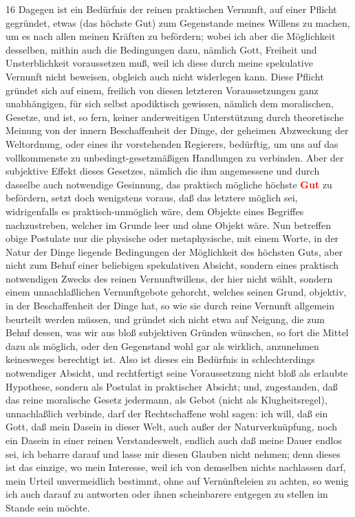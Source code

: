 \documentclass[a4paper,12pt,twoside]{book}
\newcommand{\match}[1]{\textcolor{red}{\textbf{#1}}}
\begin{document}
	
	16
	Dagegen ist ein Bedürfnis der reinen praktischen Vernunft, auf einer Pflicht gegründet, etwas (das höchste Gut) zum Gegenstande meines Willens zu machen, um es nach allen meinen Kräften zu befördern; wobei ich aber die Möglichkeit desselben, mithin auch die Bedingungen dazu, nämlich Gott, Freiheit und Unsterblichkeit voraussetzen muß, weil  ich diese durch meine spekulative Vernunft nicht beweisen, obgleich auch nicht widerlegen kann. Diese Pflicht gründet sich auf einem, freilich von diesen letzteren Voraussetzungen ganz unabhängigen, für sich selbst apodiktisch gewissen, nämlich dem moralischen, Gesetze, und ist, so fern, keiner anderweitigen Unterstützung durch theoretische Meinung von der innern Beschaffenheit der Dinge, der geheimen Abzweckung der Weltordnung, oder eines ihr vorstehenden Regierers, bedürftig, um uns auf das vollkommenste zu unbedingt-gesetzmäßigen Handlungen zu verbinden. Aber der subjektive Effekt dieses Gesetzes, nämlich die ihm angemessene und durch dasselbe auch notwendige Gesinnung, das praktisch mögliche höchste \match{Gut} zu befördern, setzt doch wenigstens voraus, daß das letztere möglich sei, widrigenfalls es praktisch-unmöglich wäre, dem Objekte eines Begriffes nachzustreben, welcher im Grunde leer und ohne Objekt wäre. Nun betreffen obige Postulate nur die physische oder metaphysische, mit einem Worte, in der Natur der Dinge liegende Bedingungen der Möglichkeit des höchsten Guts, aber nicht zum Behuf einer beliebigen spekulativen Absicht, sondern eines praktisch notwendigen Zwecks des reinen Vernunftwillens, der hier nicht wählt, sondern einem unnachlaßlichen Vernunftgebote gehorcht, welches seinen Grund, objektiv, in der Beschaffenheit der Dinge hat, so wie sie durch reine Vernunft allgemein beurteilt werden müssen, und gründet sich nicht etwa auf Neigung, die zum Behuf dessen, was wir aus bloß subjektiven Gründen wünschen, so fort die Mittel dazu als möglich, oder den Gegenstand wohl gar als wirklich, anzunehmen keinesweges berechtigt ist. Also ist dieses ein Bedürfnis in schlechterdings notwendiger Absicht, und rechtfertigt seine Voraussetzung nicht bloß als erlaubte Hypothese, sondern als Postulat in praktischer Absicht; und, zugestanden, daß das reine moralische Gesetz jedermann, als Gebot (nicht als Klugheitsregel), unnachlaßlich verbinde, darf der Rechtschaffene wohl sagen: ich will, daß ein Gott, daß mein Dasein in dieser Welt, auch außer der Naturverknüpfung, noch ein Dasein in einer reinen Verstandeswelt,  endlich auch daß meine Dauer endlos sei, ich beharre darauf und lasse mir diesen Glauben nicht nehmen; denn dieses ist das einzige, wo mein Interesse, weil ich von demselben nichts nachlassen darf, mein Urteil unvermeidlich bestimmt, ohne auf Vernünfteleien zu achten, so wenig ich auch darauf zu antworten oder ihnen scheinbarere entgegen zu stellen im Stande sein möchte.
	
\end{document}
